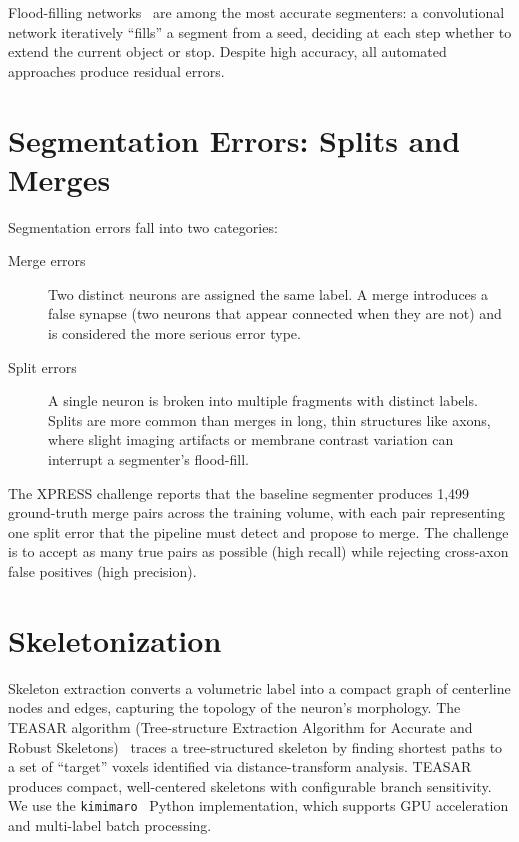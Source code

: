 Flood-filling networks~\cite{januszewski2018high} are among the most accurate
segmenters: a convolutional network iteratively ``fills'' a segment from a seed,
deciding at each step whether to extend the current object or stop. Despite
high accuracy, all automated approaches produce residual errors.

\section{Segmentation Errors: Splits and Merges}

Segmentation errors fall into two categories:

\begin{description}
  \item[Merge errors] Two distinct neurons are assigned the same label. A merge
        introduces a false synapse (two neurons that appear connected when they
        are not) and is considered the more serious error type.
  \item[Split errors] A single neuron is broken into multiple fragments with
        distinct labels. Splits are more common than merges in long, thin structures
        like axons, where slight imaging artifacts or membrane contrast variation
        can interrupt a segmenter's flood-fill.
\end{description}

The XPRESS challenge reports that the baseline segmenter produces 1{,}499
ground-truth merge pairs across the training volume, with each pair representing
one split error that the pipeline must detect and propose to merge. The challenge
is to accept as many true pairs as possible (high recall) while rejecting
cross-axon false positives (high precision).

\section{Skeletonization}

Skeleton extraction converts a volumetric label into a compact graph of
centerline nodes and edges, capturing the topology of the neuron's morphology.
The TEASAR algorithm (Tree-structure Extraction Algorithm for Accurate and Robust
Skeletons)~\cite{sato2000teasar} traces a tree-structured skeleton by finding
shortest paths to a set of ``target'' voxels identified via distance-transform
analysis. TEASAR produces compact, well-centered skeletons with configurable
branch sensitivity. We use the \texttt{kimimaro}~\cite{kimimaro} Python
implementation, which supports GPU acceleration and multi-label batch processing.

